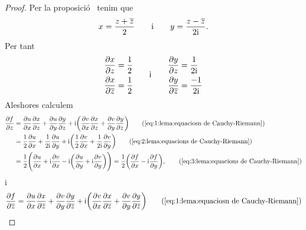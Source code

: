 \documentclass[../Apunts.tex]{subfiles}
\begin{document}
	\begin{proof}
		Per la proposició~ tenim que
		\[
			x=\frac{z+\overline{z}}{2}
			\qquad\text{i}\qquad
			y=\frac{z-\overline{z}}{2\mathrm{i}}.
		\]
		Per tant
		\begin{gather}
			\label{eq:2:lema:equacions de Cauchy-Riemann}
			\begin{split}
				\frac{\partial x}{\partial z}&=\frac{1}{2}\\
				\frac{\partial x}{\partial\overline{z}}&=\frac{1}{2}
			\end{split}\qquad\text{i}\qquad
			\begin{split}
				\frac{\partial y}{\partial z}&=\frac{1}{2\mathrm{i}}\\
				\frac{\partial y}{\partial\overline{z}}&=\frac{-1}{2\mathrm{i}}
			\end{split}
		\end{gather}
		Aleshores calculem
		\begin{align*}
			\frac{\partial f}{\partial z}
			&=\frac{\partial u}{\partial x}\frac{\partial x}{\partial z}
			+\frac{\partial u}{\partial y}\frac{\partial y}{\partial z}
			+\iu\biggl(\frac{\partial v}{\partial x}\frac{\partial x}{\partial z}
			+\frac{\partial v}{\partial y}\frac{\partial y}{\partial z}\biggr)
			\tag{\ref{eq:1:lema:equaciosn de Cauchy-Riemann}}\\
			&=\frac{1}{2}\frac{\partial u}{\partial x}+
			\frac{1}{2\iu}\frac{\partial u}{\partial y}+
			\iu\biggl(\frac{1}{2}\frac{\partial v}{\partial x}
			+\frac{1}{2\iu}\frac{\partial v}{\partial y}\biggr)
			\tag{\ref{eq:2:lema:equacions de Cauchy-Riemann}}\\
			&=\frac{1}{2}\Biggl(\frac{\partial u}{\partial x}
			+\iu\frac{\partial v}{\partial x}
			-\iu\biggl(\frac{\partial u}{\partial y}
			+\iu\frac{\partial v}{\partial y}\biggr)\Biggr)
			=\frac{1}{2}\biggl(\frac{\partial f}{\partial x}
			-\iu\frac{\partial f}{\partial y}\biggr),
			\tag{\ref{eq:3:lema:equacions de Cauchy-Riemann}}
		\end{align*}
		i
		\begin{align*}
			\frac{\partial f}{\partial\conjugat{z}}
			&=\frac{\partial u}{\partial x}\frac{\partial x}{\partial\conjugat{z}}
			+\frac{\partial v}{\partial y}\frac{\partial y}{\partial\conjugat{z}}
			+\iu\biggl(\frac{\partial v}{\partial x}\frac{\partial x}{\partial\conjugat{z}}
			+\frac{\partial v}{\partial y}\frac{\partial y}{\partial\conjugat{z}}\biggr)
			\tag{\ref{eq:1:lema:equaciosn de Cauchy-Riemann}}\\

\end{align*}
\end{proof}
\end{document}
